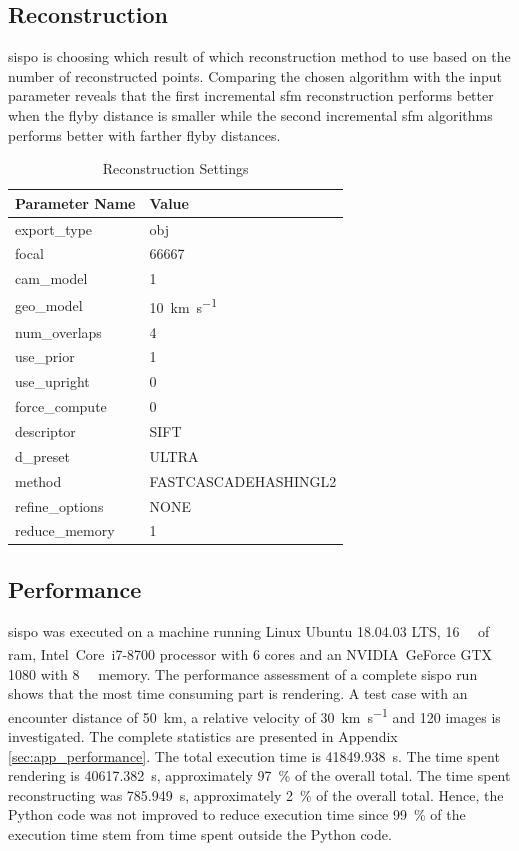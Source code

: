 \subsection{Reconstruction}
\gls{sispo} is choosing which result of which reconstruction method to use based on the number of reconstructed points. Comparing the chosen algorithm with the input parameter reveals that the first incremental \gls{sfm} reconstruction performs better when the flyby distance is smaller while the second incremental \gls{sfm} algorithms performs better with farther flyby distances.

\begin{table}[htb]
    \centering
    \caption{Reconstruction Settings}
    \label{tab:comp_settings}
    \begin{tabular}{l|l}
        \textbf{Parameter Name} & \textbf{Value} \\ \hline
        export\_type       & obj   \\
        focal & 66667 \\
        cam\_model & \SI{1}{}     \\
        geo\_model & \SI{10}{\kilo\meter\per\second} \\
        num\_overlaps  & \SI{4}{} \\
        use\_prior & \SI{1}{} \\
        use\_upright & \SI{0}{} \\
        force\_compute & \SI{0}{} \\
        descriptor & SIFT \\
        d\_preset & ULTRA \\
        method & FASTCASCADEHASHINGL2 \\
        refine\_options & NONE \\
        reduce\_memory & 1
    \end{tabular}
\end{table}

\subsection{Performance}
\gls{sispo} was executed on a machine running Linux Ubuntu 18.04.03 LTS, \SI{16}{\giga\byte} of \gls{ram}, Intel\textsuperscript{\textregistered}~Core\texttrademark~i7-8700 processor with \SI{6}{} cores and an NVIDIA\textsuperscript{\textregistered}~GeForce GTX 1080 with \SI{8}{\giga\byte} memory. The performance assessment of a complete \gls{sispo} run shows that the most time consuming part is rendering. 
A test case with an encounter distance of \SI{50}{\kilo\meter}, a relative velocity of \SI{30}{\kilo\meter\per\second} and \SI{120}{} images is investigated. The complete statistics are presented in Appendix \ref{sec:app_performance}. The total execution time is \SI{41849.938}{\second}. The time spent rendering is \SI{40617.382}{\second}, approximately \SI{97}{\percent} of the overall total. The time spent reconstructing was \SI{785.949}{\second}, approximately \SI{2}{\percent} of the overall total. Hence, the Python code was not improved to reduce execution time since \SI{99}{\percent} of the execution time stem from time spent outside the Python code.